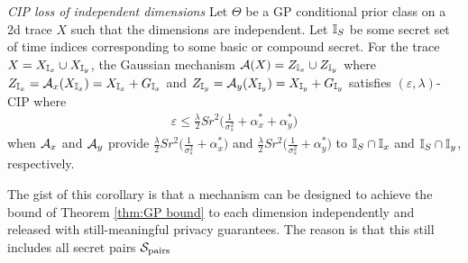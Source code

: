 \begin{corollary}\emph{CIP loss of independent dimensions} 
\label{cor: independence}
	Let $\Theta$ be a GP conditional prior class on a 2d trace $X$ such that the dimensions are independent. Let ${\mathbb{I}_S}$ be some secret set of time indices corresponding to some basic or compound secret. For the trace $X = {X_{\mathbb{I}_x}} \cup {X_{\mathbb{I}_y}}$, the Gaussian mechanism $\mathcal{A}(X) = {Z_{\mathbb{I}_x}} \cup {Z_{\mathbb{I}_y}}$ where ${Z_{\mathbb{I}_x}} = \mathcal{A}_x({X_{\mathbb{I}_x}}) = {X_{\mathbb{I}_x}} + {G_{\mathbb{I}_x}}$ and ${Z_{\mathbb{I}_y}} = \mathcal{A}_y({X_{\mathbb{I}_y}}) = {X_{\mathbb{I}_y}} + {G_{\mathbb{I}_y}}$ satisfies $(\varepsilon, \lambda)$-CIP where
	\begin{align*}
		\varepsilon \leq \frac{\lambda}{2} S r^2 \big( \frac{1}{\sigma_s^2} + \alpha^*_x + \alpha^*_y \big) 
	\end{align*} 
	when $\mathcal{A}_x$ and $\mathcal{A}_y$ provide $\frac{\lambda}{2} S r^2 \big( \frac{1}{\sigma_s^2} + \alpha^*_x)$ and $\frac{\lambda}{2} S r^2 \big( \frac{1}{\sigma_s^2} + \alpha^*_y)$ to ${\mathbb{I}_S} \cap \mathbb{I}_x$ and ${\mathbb{I}_S} \cap \mathbb{I}_y$, respectively. 
\end{corollary}
The gist of this corollary is that a mechanism can be designed to achieve the bound of Theorem \ref{thm:GP bound} to each dimension independently and released with still-meaningful privacy guarantees. The reason is that this still includes all secret pairs $\mathcal{S}_{\text{pairs}}$ 
